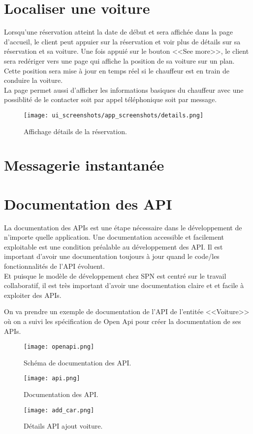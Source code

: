 \section{Localiser une voiture}
Lorsqu'une réservation atteint la date de début et sera affichée dans la page d'accueil, le client peut appuier sur la réservation et voir plus de détails sur sa réservation et sa voiture. Une fois appuié sur le bouton <<See more>>, le client sera redériger vers une page qui affiche la position de sa voiture sur un plan. Cette position sera mise à jour en temps réel si le chauffeur est en train de conduire la voiture.\\
\noindent La page permet aussi d'afficher les informations basiques du chauffeur avec une possiblité de le contacter soit par appel téléphonique soit par message.
\begin{figure}[H]
    \centering
    \texttt{[image: ui\_screenshots/app\_screenshots/details.png]}
    \captionsetup{justification=centering}
    \caption{Affichage détails de la réservation.}
    \label{fig:res_details}
\end{figure}
\section{Messagerie instantanée}
\section{Documentation des API}
La documentation des APIs est une étape nécessaire dans le développement de n'importe quelle application. Une documentation accessible et facilement exploitable est une condition préalable au développement des API. Il est important d'avoir une documentation toujours à jour quand le code/les fonctionnalités de l'API évoluent.\\
\noindent Et puisque le modèle de développement chez SPN est centré sur le travail collaboratif, il est très important d'avoir une documentation claire et et facile à exploiter des APIs.

On va prendre un exemple de documentation de l'API de l'entitée <<Voiture>> où on a suivi les spécification de Open Api pour créer la documentation de ses APIs.
\begin{figure}[H]
    \centering
    \texttt{[image: openapi.png]}
    \captionsetup{justification=centering}
    \caption{Schéma de documentation des API.}
    \label{fig:api_doc_schema}
\end{figure}
\clearpage
\begin{figure}[H]
    \centering
    \texttt{[image: api.png]}
    \captionsetup{justification=centering}
    \caption{Documentation des API.}
    \label{fig:api_doc}
\end{figure}
\begin{figure}[H]
    \centering
    \texttt{[image: add\_car.png]}
    \captionsetup{justification=centering}
    \caption{Détails API ajout voiture.}
    \label{fig:api_doc_detail}
\end{figure}
